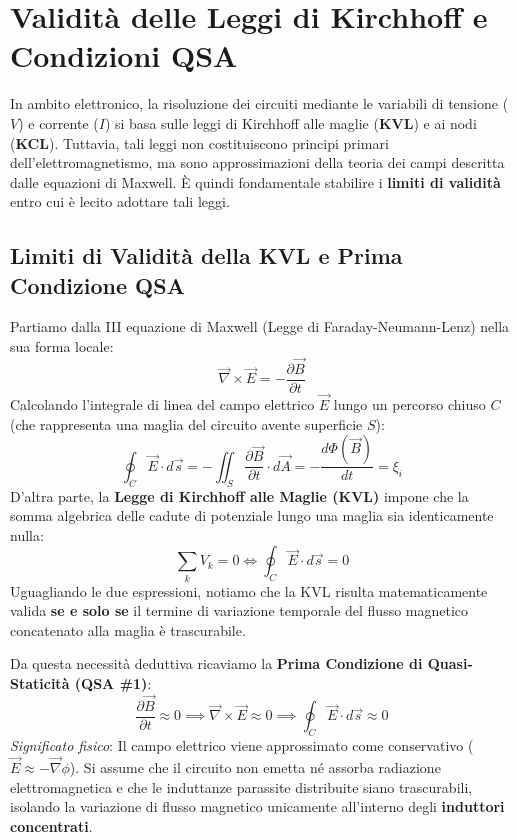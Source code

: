 \documentclass[12pt, a4paper]{report}
\begin{document}
\section{Validità delle Leggi di Kirchhoff e Condizioni QSA}
In ambito elettronico, la risoluzione dei circuiti mediante le variabili di tensione ($V$) e corrente ($I$) si basa sulle leggi di Kirchhoff alle maglie (\textbf{KVL}) e ai nodi (\textbf{KCL}). Tuttavia, tali leggi non costituiscono principi primari dell'elettromagnetismo, ma sono approssimazioni della teoria dei campi descritta dalle equazioni di Maxwell. È quindi fondamentale stabilire i \textbf{limiti di validità} entro cui è lecito adottare tali leggi.


\subsection{Limiti di Validità della KVL e Prima Condizione QSA}
Partiamo dalla III equazione di Maxwell (Legge di Faraday-Neumann-Lenz) nella sua forma locale:
\begin{equation}
    \vec{\nabla} \times \vec{E} = -\frac{\partial \vec{B}}{\partial t}
\end{equation}
Calcolando l'integrale di linea del campo elettrico $\vec{E}$ lungo un percorso chiuso $C$ (che rappresenta una maglia del circuito avente superficie $S$):
\begin{equation}
    \oint_{C} \vec{E} \cdot d\vec{s} = -\iint_{S} \frac{\partial \vec{B}}{\partial t} \cdot d\vec{A} = -\frac{d\Phi(\vec{B})}{dt} = \xi_i
\end{equation}
D'altra parte, la \textbf{Legge di Kirchhoff alle Maglie (KVL)} impone che la somma algebrica delle cadute di potenziale lungo una maglia sia identicamente nulla:
\begin{equation}
    \sum_{k} V_k = 0 \iff \oint_{C} \vec{E} \cdot d\vec{s} = 0
\end{equation}
Uguagliando le due espressioni, notiamo che la KVL risulta matematicamente valida \textbf{se e solo se} il termine di variazione temporale del flusso magnetico concatenato alla maglia è trascurabile. 

Da questa necessità deduttiva ricaviamo la \textbf{Prima Condizione di Quasi-Staticità (QSA \#1)}:
\begin{equation}
    \frac{\partial \vec{B}}{\partial t} \approx 0 \implies \vec{\nabla} \times \vec{E} \approx 0 \implies \oint_{C} \vec{E} \cdot d\vec{s} \approx 0
\end{equation}
\textit{Significato fisico}: Il campo elettrico viene approssimato come conservativo ($\vec{E} \approx -\vec{\nabla}\phi$). Si assume che il circuito non emetta né assorba radiazione elettromagnetica e che le induttanze parassite distribuite siano trascurabili, isolando la variazione di flusso magnetico unicamente all'interno degli \textbf{induttori concentrati}.
\end{document}
